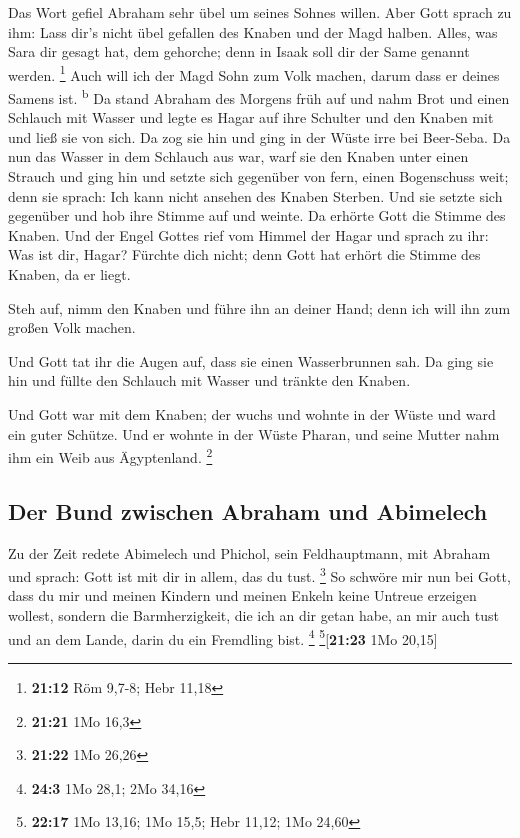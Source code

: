  Das Wort gefiel Abraham sehr übel um seines Sohnes
willen.  Aber Gott sprach zu ihm: Lass dir's nicht übel
gefallen des Knaben und der Magd halben. Alles, was Sara dir gesagt hat,
dem gehorche; denn in Isaak soll dir der Same genannt werden.
\footnote{\textbf{21:12} Röm 9,7-8; Hebr 11,18}  Auch
will ich der Magd Sohn zum Volk machen, darum dass er deines Samens ist.
\textsuperscript{b}  Da stand Abraham des Morgens früh
auf und nahm Brot und einen Schlauch mit Wasser und legte es Hagar auf
ihre Schulter und den Knaben mit und ließ sie von sich. Da zog sie hin
und ging in der Wüste irre bei Beer-Seba.  Da nun das
Wasser in dem Schlauch aus war, warf sie den Knaben unter einen Strauch
 und ging hin und setzte sich gegenüber von fern, einen
Bogenschuss weit; denn sie sprach: Ich kann nicht ansehen des Knaben
Sterben. Und sie setzte sich gegenüber und hob ihre Stimme auf und
weinte.  Da erhörte Gott die Stimme des Knaben. Und der
Engel Gottes rief vom Himmel der Hagar und sprach zu ihr: Was ist dir,
Hagar? Fürchte dich nicht; denn Gott hat erhört die Stimme des Knaben,
da er liegt.

 Steh auf, nimm den Knaben und führe ihn an deiner Hand;
denn ich will ihn zum großen Volk machen.

 Und Gott tat ihr die Augen auf, dass sie einen
Wasserbrunnen sah. Da ging sie hin und füllte den Schlauch mit Wasser
und tränkte den Knaben.

 Und Gott war mit dem Knaben; der wuchs und wohnte in der
Wüste und ward ein guter Schütze.  Und er wohnte in der
Wüste Pharan, und seine Mutter nahm ihm ein Weib aus Ägyptenland.
\footnote{\textbf{21:21} 1Mo 16,3}

\hypertarget{der-bund-zwischen-abraham-und-abimelech}{%
\subsection{Der Bund zwischen Abraham und
Abimelech}\label{der-bund-zwischen-abraham-und-abimelech}}

 Zu der Zeit redete Abimelech und Phichol, sein
Feldhauptmann, mit Abraham und sprach: Gott ist mit dir in allem, das du
tust. \footnote{\textbf{21:22} 1Mo 26,26}  So schwöre mir
nun bei Gott, dass du mir und meinen Kindern und meinen Enkeln keine
Untreue erzeigen wollest, sondern die Barmherzigkeit, die ich an dir
getan habe, an mir auch tust und an dem Lande, darin du ein Fremdling
bist. \footnote{\textbf{24:3} 1Mo 28,1; 2Mo 34,16}
\footnote{\textbf{22:17} 1Mo 13,16; 1Mo 15,5; Hebr 11,12; 1Mo 24,60}{[}\textbf{21:23}
1Mo 20,15{]}

